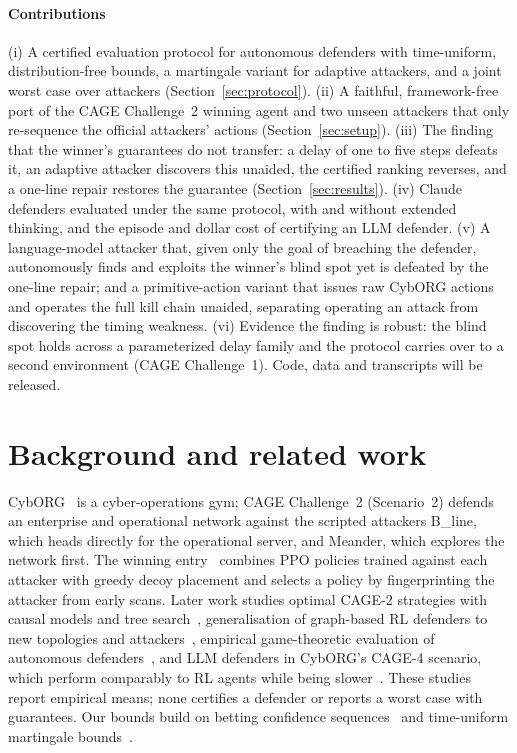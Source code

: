 \documentclass[conference,compsoc]{IEEEtran}
\begin{document}
\paragraph{Contributions}
(i) A certified evaluation protocol for autonomous defenders with time-uniform,
distribution-free bounds, a martingale variant for adaptive attackers, and a joint worst
case over attackers (Section~\ref{sec:protocol}). (ii) A faithful, framework-free port
of the CAGE Challenge~2 winning agent and two unseen attackers that only re-sequence the
official attackers' actions (Section~\ref{sec:setup}). (iii) The finding that the
winner's guarantees do not transfer: a delay of one to five steps defeats it, an
adaptive attacker discovers this unaided, the certified ranking reverses, and a one-line
repair restores the guarantee (Section~\ref{sec:results}). (iv) Claude defenders
evaluated under the same protocol, with and without extended thinking, and the episode
and dollar cost of certifying an LLM defender. (v) A language-model attacker that, given
only the goal of breaching the defender, autonomously finds and exploits the winner's
blind spot yet is defeated by the one-line repair; and a primitive-action variant that
issues raw CybORG actions and operates the full kill chain unaided, separating operating
an attack from discovering the timing weakness. (vi) Evidence the finding is robust: the
blind spot holds across a parameterized delay family and the protocol carries over to a
second environment (CAGE Challenge~1). Code, data and transcripts will be released.

\section{Background and related work}
CybORG~\cite{standen2021cyborg} is a cyber-operations gym; CAGE Challenge~2 (Scenario~2)
defends an enterprise and operational network against the scripted attackers B\_line,
which heads directly for the operational server, and Meander, which explores the network
first. The winning entry~\cite{hannay2022cardiff} combines PPO policies trained against
each attacker with greedy decoy placement and selects a policy by fingerprinting the
attacker from early scans. Later work studies optimal CAGE-2 strategies with causal
models and tree search~\cite{hammar2024optimal}, generalisation of graph-based RL
defenders to new topologies and attackers~\cite{king2025graph}, empirical game-theoretic
evaluation of autonomous defenders~\cite{palmer2025egta}, and LLM defenders in CybORG's CAGE-4 scenario, which perform comparably to RL agents
while being slower~\cite{castro2025llm}. These
studies report empirical means; none certifies a defender or reports a worst case with
guarantees. Our bounds build on betting confidence
sequences~\cite{waudbysmith2023betting} and time-uniform martingale
bounds~\cite{howard2021timeuniform}.
\end{document}
